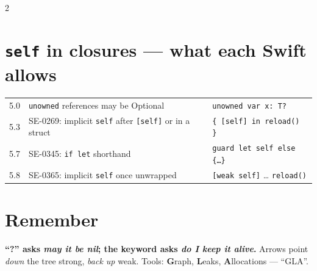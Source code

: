 \documentclass[8pt]{extarticle}
\begin{document}
\begin{multicols}{2}
\section{\texttt{self} in closures — what each Swift allows}
{\footnotesize
\begin{tabular}{@{}l l l@{}}
\toprule
5.0 & \texttt{unowned} references may be Optional & \texttt{unowned var x: T?} \\
5.3 & SE-0269: implicit \texttt{self} after \texttt{[self]} or in a struct & \texttt{\{ [self] in reload() \}} \\
5.7 & SE-0345: \texttt{if let} shorthand & \texttt{guard let self else \{…\}} \\
5.8 & SE-0365: implicit \texttt{self} once unwrapped & \texttt{[weak self]} … \texttt{reload()} \\
\bottomrule
\end{tabular}}

\section{Remember}
\textbf{``?'' asks \emph{may it be nil}; the keyword asks \emph{do I keep it
alive}.} Arrows point \emph{down} the tree strong, \emph{back up} weak.
Tools: \textbf{G}raph, \textbf{L}eaks, \textbf{A}llocations — ``GLA''.


\end{multicols}

\end{document}
